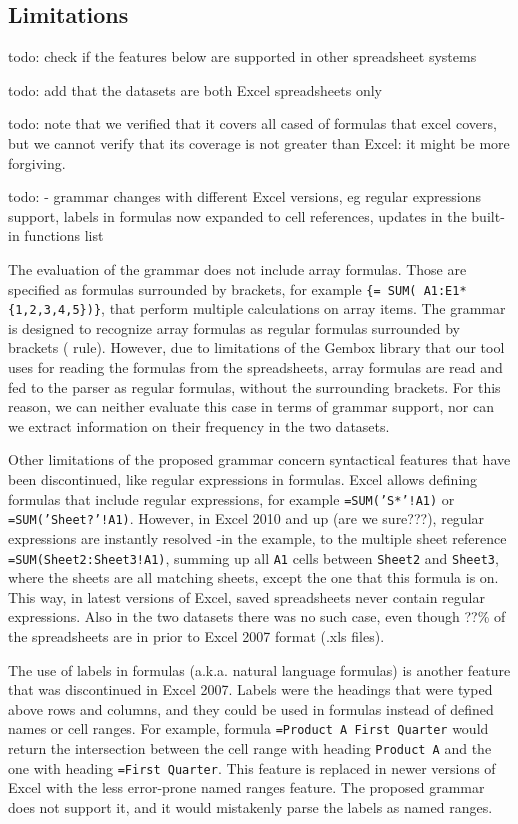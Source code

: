 \documentclass[conference]{IEEEtran}
\begin{document}
\subsection{Limitations}
todo: check if the features below are supported in other spreadsheet systems

todo: add that the datasets are both Excel spreadsheets only

todo: note that we verified that it covers all cased of formulas that excel covers, but we cannot verify that its coverage is not greater than Excel: it might be more forgiving.

todo: - grammar changes with different Excel versions, eg regular expressions support, labels in formulas now expanded to cell
references, updates in the built-in functions list

The evaluation of the grammar does not include array formulas. Those are specified as formulas surrounded by brackets, for example \texttt{\{= SUM( A1:E1*\{1,2,3,4,5\})\}}, that perform multiple calculations on array items. The grammar is designed to recognize array formulas as regular formulas surrounded by brackets ( rule). However, due to limitations of the Gembox library that our tool uses for reading the formulas from the spreadsheets, array formulas are read and fed to the parser as regular formulas, without the surrounding brackets. For this reason, we can neither evaluate this case in terms of grammar support, nor can we extract information on their frequency in the two datasets.

Other limitations of the proposed grammar concern syntactical features that have been discontinued, like regular expressions in formulas. Excel allows defining formulas that include regular expressions, for example \texttt{=SUM('S*'!A1)} or \texttt{=SUM('Sheet?'!A1)}. However, in Excel 2010 and up (are we sure???), regular expressions are instantly resolved -in the example, to the multiple sheet reference \texttt{=SUM(Sheet2:Sheet3!A1)}, summing up all \texttt{A1} cells between \texttt{Sheet2} and \texttt{Sheet3}, where the sheets are all matching sheets, except the one that this formula is on. This way, in latest versions of Excel, saved spreadsheets never contain regular expressions. Also in the two datasets there was no such case, even though ??\% of the spreadsheets are in prior to Excel 2007 format (.xls files). 

The use of labels in formulas (a.k.a. natural language formulas) is another feature that was discontinued in Excel 2007. Labels were the headings that were typed above rows and columns, and they could be used in formulas instead of defined names or cell ranges. For example, formula \texttt{=Product A First Quarter} would return the intersection between the cell range with heading \texttt{Product A} and the one with heading \texttt{=First Quarter}. This feature is replaced in newer versions of Excel with the less error-prone named ranges feature. The proposed grammar does not support it, and it would mistakenly parse the labels as named ranges.
\end{document}
